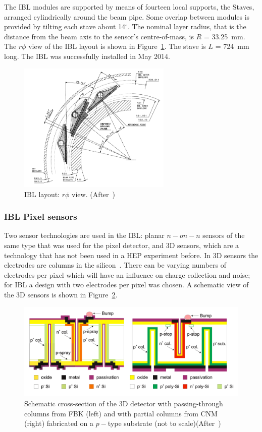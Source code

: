 The IBL modules are supported by means of fourteen local supports, the Staves, arranged cylindrically
around the beam pipe. Some overlap between modules is provided by tilting each stave
about 14$^{\circ}$. The nominal layer radius, that is the distance from the beam axis to the sensor's
centre-of-mass, is $R$ = 33.25~mm. The $r\phi$ view of the IBL layout is shown in Figure~\ref{fig:IBLrphi}. The stave is $L$ = 724~mm long. The IBL was successfully installed in May 2014.


\begin{figure}[!htpb]
\centering
\includegraphics[width=0.65\textwidth]{IBLrphi.png}
\caption{\label{fig:IBLrphi}IBL layout: $r\phi$ view. (After~\cite{IBLTDR})}
\end{figure}

\subsubsection{IBL Pixel sensors}
Two sensor technologies are used in the IBL: planar $n-on-n$ sensors of the same type
that was used for the pixel detector, and 3D sensors, which are a 
technology that has not
been used in a HEP experiment before. In 3D sensors the electrodes are columns in
the silicon~\cite{PARKER1997328}. There can be varying numbers of electrodes per pixel which will 
have an influence on charge collection and noise; for IBL a design with two electrodes per pixel was chosen. A schematic view of the 3D sensors is shown in Figure~\ref{fig:IBLtredi}.
\begin{figure}[!htpb]
\centering
\includegraphics[width=1.00\textwidth]{tredi.png}
\caption{\label{fig:IBLtredi} Schematic cross-section of the 3D detector with passing-through columns from FBK (left) and
with partial columns from CNM (right) fabricated on a $p-$type substrate (not to scale)(After~\cite{Darbo:2014kma})}
\end{figure}



